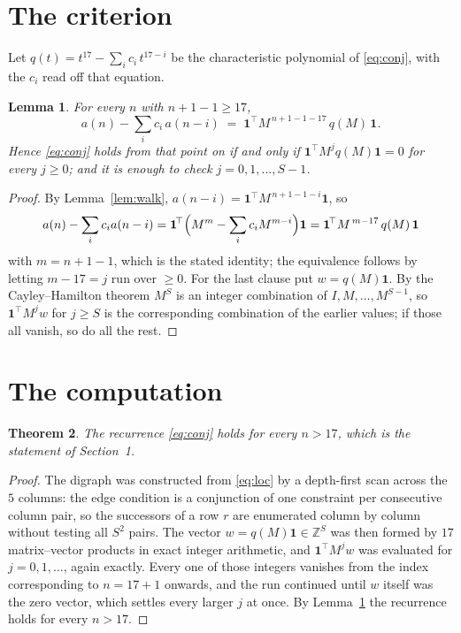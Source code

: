 \documentclass[11pt,a4paper]{article}
\theoremstyle{plain}
\newtheorem{theorem}{Theorem}
\newtheorem{lemma}[theorem]{Lemma}
\theoremstyle{definition}
\begin{document}
\section{The criterion}

Let $q(t)=t^{17}-\sum_i c_i\,t^{17-i}$ be the characteristic polynomial of
\eqref{eq:conj}, with the $c_i$ read off that equation.

\begin{lemma}\label{lem:crit}
For every $n$ with $n+1-1\ge17$,
\[
a(n)-\sum_i c_i\,a(n-i)\;=\;\mathbf{1}^{\!\top}M^{\,n+1-1-17}\,q(M)\,\mathbf{1} .
\]
Hence \eqref{eq:conj} holds from that point on if and only if
$\mathbf{1}^{\!\top}M^{j}q(M)\mathbf{1}=0$ for every $j\ge0$; and it is enough to check
$j=0,1,\dots,S-1$.
\end{lemma}

\begin{proof}
By Lemma~\ref{lem:walk}, $a(n-i)=\mathbf{1}^{\!\top}M^{\,n+1-1-i}\mathbf{1}$, so
\[
a(n)-\sum_i c_i a(n-i)
=\mathbf{1}^{\!\top}\Bigl(M^{m}-\sum_i c_i M^{m-i}\Bigr)\mathbf{1}
=\mathbf{1}^{\!\top}M^{\,m-17}\,q(M)\,\mathbf{1}
\]
with $m=n+1-1$, which is the stated identity; the equivalence follows by letting
$m-17=j$ run over $\ge0$. For the last clause put $w=q(M)\mathbf{1}$. By the
Cayley--Hamilton theorem $M^{S}$ is an integer combination of $I,M,\dots,M^{S-1}$, so
$\mathbf{1}^{\!\top}M^{j}w$ for $j\ge S$ is the corresponding combination of the earlier
values; if those all vanish, so do all the rest.
\end{proof}

\section{The computation}

\begin{theorem}
The recurrence \eqref{eq:conj} holds for every $n>17$, which is the statement of
Section~1.
\end{theorem}

\begin{proof}
The digraph was constructed from \eqref{eq:loc} by a depth-first scan across the $5$
columns: the edge condition is a conjunction of one constraint per consecutive column
pair, so the successors of a row $r$ are enumerated column by column without testing all
$S^2$ pairs. The vector $w=q(M)\mathbf{1}\in\mathbb{Z}^{S}$ was then formed by $17$
matrix--vector products in exact integer arithmetic, and $\mathbf{1}^{\!\top}M^{j}w$ was
evaluated for $j=0,1,\dots$, again exactly. Every one of those integers vanishes from the
index corresponding to $n=17+1$ onwards, and the run continued until $w$ itself was the
zero vector, which settles every larger $j$ at once. By Lemma~\ref{lem:crit} the recurrence
holds for every $n>17$.
\end{proof}
\end{document}
